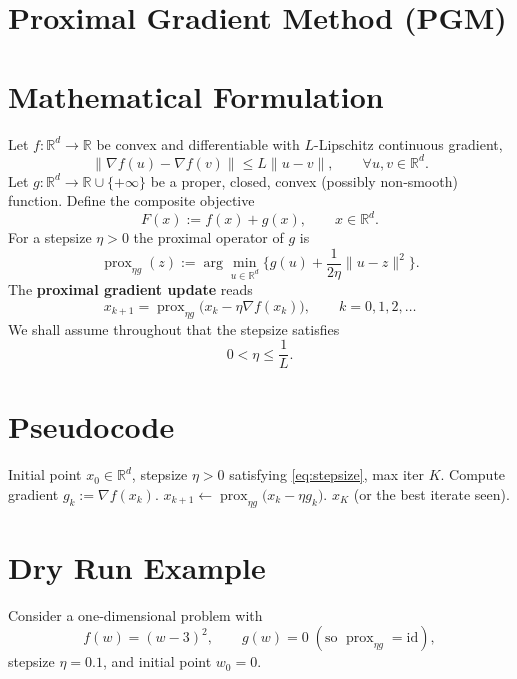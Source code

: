 \documentclass{article}
\newcommand{\prox}{\operatorname{prox}}
\newcommand{\R}{\mathbb{R}}
\begin{document}
\section*{Proximal Gradient Method (PGM)}

\section*{Mathematical Formulation}
Let $f:\R^{d}\to\R$ be convex and differentiable with $L$-Lipschitz continuous gradient,
\[
\|\nabla f(u)-\nabla f(v)\|\le L\|u-v\|,\qquad\forall u,v\in\R^{d}.
\]
Let $g:\R^{d}\to\R\cup\{+\infty\}$ be a proper, closed, convex (possibly non‑smooth) function.
Define the composite objective
\[
F(x):=f(x)+g(x),\qquad x\in\R^{d}.
\]
For a stepsize $\eta>0$ the proximal operator of $g$ is
\[
\prox_{\eta g}(z):=\arg\min_{u\in\R^{d}}\Big\{ g(u)+\frac{1}{2\eta}\|u-z\|^{2}\Big\}.
\]
The \textbf{proximal gradient update} reads
\begin{equation}
\label{eq:update}
x_{k+1}= \prox_{\eta g}\!\bigl(x_{k}-\eta\nabla f(x_{k})\bigr),\qquad k=0,1,2,\dots
\end{equation}
We shall assume throughout that the stepsize satisfies
\begin{equation}
\label{eq:stepsize}
0<\eta\le \frac{1}{L}.
\end{equation}

\section*{Pseudocode}
\begin{algorithm}[H]
\caption{Proximal Gradient Method}
\begin{algorithmic}[1]
\Require Initial point $x_{0}\in\R^{d}$, stepsize $\eta>0$ satisfying \eqref{eq:stepsize}, max iter $K$.
    \State Compute gradient $g_{k}:=\nabla f(x_{k})$.
    \State $x_{k+1}\gets \prox_{\eta g}\!\bigl(x_{k}-\eta g_{k}\bigr)$.
\EndFor
\State \Return $x_{K}$ (or the best iterate seen).
\end{algorithmic}
\end{algorithm}

\section*{Dry Run Example}
Consider a one‑dimensional problem with  
\[
f(w)=(w-3)^{2},\qquad g(w)=0\;( \text{so }\prox_{\eta g}= \text{id}),
\]
stepsize $\eta=0.1$, and initial point $w_{0}=0$.
\end{document}
